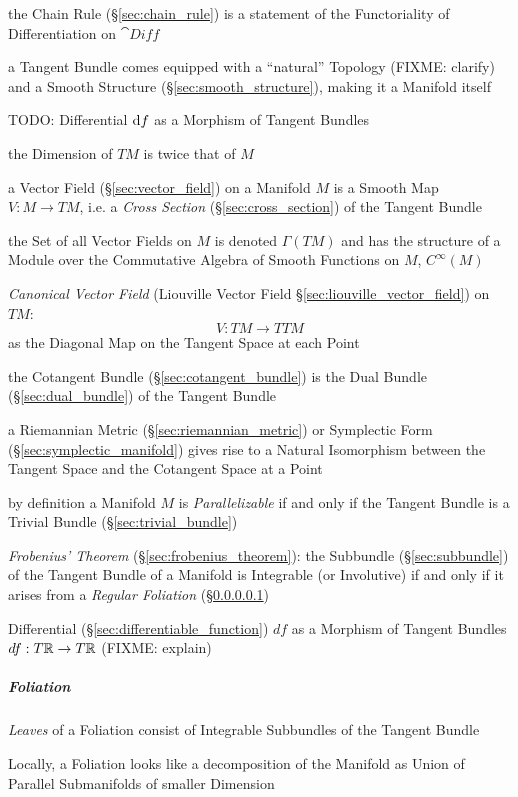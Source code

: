 the Chain Rule (\S\ref{sec:chain_rule}) is a statement of the Functoriality of
Differentiation on $\cat{Diff}$

a Tangent Bundle comes equipped with a ``natural'' Topology (FIXME: clarify)
and a Smooth Structure (\S\ref{sec:smooth_structure}), making it a Manifold
itself

TODO: Differential $\mathrm{d}f$ as a Morphism of Tangent Bundles

the Dimension of $T M$ is twice that of $M$

a Vector Field (\S\ref{sec:vector_field}) on a Manifold $M$ is a Smooth Map $V
: M \rightarrow T M$, i.e. a \emph{Cross Section} (\S\ref{sec:cross_section})
of the Tangent Bundle

the Set of all Vector Fields on $M$ is denoted $\Gamma(TM)$ and has the
structure of a Module over the Commutative Algebra of Smooth Functions on $M$,
$C^\infty(M)$

\emph{Canonical Vector Field} (Liouville Vector Field
\S\ref{sec:liouville_vector_field}) on $TM$:
\[
  V : TM \rightarrow TTM
\]
as the Diagonal Map on the Tangent Space at each Point

the Cotangent Bundle (\S\ref{sec:cotangent_bundle}) is the Dual Bundle
(\S\ref{sec:dual_bundle}) of the Tangent Bundle

a Riemannian Metric (\S\ref{sec:riemannian_metric}) or Symplectic Form
(\S\ref{sec:symplectic_manifold}) gives rise to a Natural Isomorphism between
the Tangent Space and the Cotangent Space at a Point

by definition a Manifold $M$ is \emph{Parallelizable} if and only if the
Tangent Bundle is a Trivial Bundle (\S\ref{sec:trivial_bundle})

\emph{Frobenius' Theorem} (\S\ref{sec:frobenius_theorem}): the Subbundle
(\S\ref{sec:subbundle}) of the Tangent Bundle of a Manifold is Integrable (or
Involutive) if and only if it arises from a \emph{Regular Foliation}
(\S\ref{sec:foliation})

Differential (\S\ref{sec:differentiable_function}) $df$ as a Morphism of
Tangent Bundles $df : T\mathbb{R} \rightarrow T\mathbb{R}$ (FIXME: explain)



\subparagraph{Foliation}\label{sec:foliation}\hfill

\emph{Leaves} of a Foliation consist of Integrable Subbundles of the Tangent
Bundle

Locally, a Foliation looks like a decomposition of the Manifold as Union of
Parallel Submanifolds of smaller Dimension

